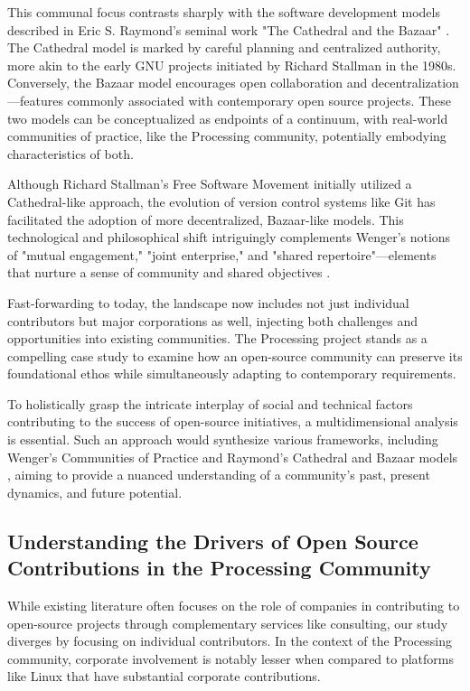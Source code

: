 \documentclass{article}
\begin{document}
This communal focus contrasts sharply with the software development models described in Eric S. Raymond's seminal work "The Cathedral and the Bazaar" \parencite{CathedralBazaarMusings2002a}. The Cathedral model is marked by careful planning and centralized authority, more akin to the early GNU projects initiated by Richard Stallman in the 1980s. Conversely, the Bazaar model encourages open collaboration and decentralization—features commonly associated with contemporary open source projects. These two models can be conceptualized as endpoints of a continuum, with real-world communities of practice, like the Processing community, potentially embodying characteristics of both.

Although Richard Stallman's Free Software Movement initially utilized a Cathedral-like approach, the evolution of version control systems like Git has facilitated the adoption of more decentralized, Bazaar-like models. This technological and philosophical shift intriguingly complements Wenger's notions of "mutual engagement," "joint enterprise," and "shared repertoire"—elements that nurture a sense of community and shared objectives \parencite{wengerCommunitiesPracticeLearning1998}.

Fast-forwarding to today, the landscape now includes not just individual contributors but major corporations as well, injecting both challenges and opportunities into existing communities. The Processing project stands as a compelling case study to examine how an open-source community can preserve its foundational ethos while simultaneously adapting to contemporary requirements.

To holistically grasp the intricate interplay of social and technical factors contributing to the success of open-source initiatives, a multidimensional analysis is essential. Such an approach would synthesize various frameworks, including Wenger's Communities of Practice \parencite{wengerCommunitiesPracticeLearning1998} and Raymond's Cathedral and Bazaar models \parencite{CathedralBazaarMusings2002a}, aiming to provide a nuanced understanding of a community's past, present dynamics, and future potential.

\subsection{Understanding the Drivers of Open Source Contributions in the Processing Community}

While existing literature often focuses on the role of companies in contributing to open-source projects through complementary services like consulting, our study diverges by focusing on individual contributors. In the context of the Processing community, corporate involvement is notably lesser when compared to platforms like Linux that have substantial corporate contributions.
\end{document}

